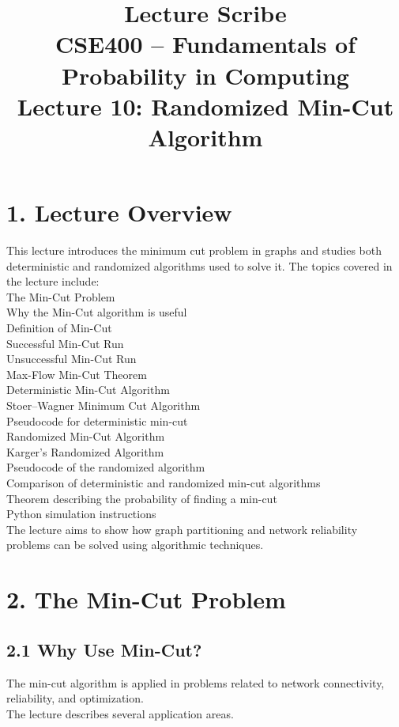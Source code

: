 \documentclass{article}
\begin{document}
\title{Lecture Scribe \\ CSE400 – Fundamentals of Probability in Computing \\ Lecture 10: Randomized Min-Cut Algorithm}
\maketitle

\section{1. Lecture Overview}
This lecture introduces the minimum cut problem in graphs and studies both deterministic and randomized algorithms used to solve it. The topics covered in the lecture include: \\
The Min-Cut Problem \\
Why the Min-Cut algorithm is useful \\
Definition of Min-Cut \\
Successful Min-Cut Run \\
Unsuccessful Min-Cut Run \\
Max-Flow Min-Cut Theorem \\
Deterministic Min-Cut Algorithm \\
Stoer–Wagner Minimum Cut Algorithm \\
Pseudocode for deterministic min-cut \\
Randomized Min-Cut Algorithm \\
Karger's Randomized Algorithm \\
Pseudocode of the randomized algorithm \\
Comparison of deterministic and randomized min-cut algorithms \\
Theorem describing the probability of finding a min-cut \\
Python simulation instructions \\
The lecture aims to show how graph partitioning and network reliability problems can be solved using algorithmic techniques.

\section{2. The Min-Cut Problem}

\subsection{2.1 Why Use Min-Cut?}
The min-cut algorithm is applied in problems related to network connectivity, reliability, and optimization. \\
The lecture describes several application areas.
\end{document}
